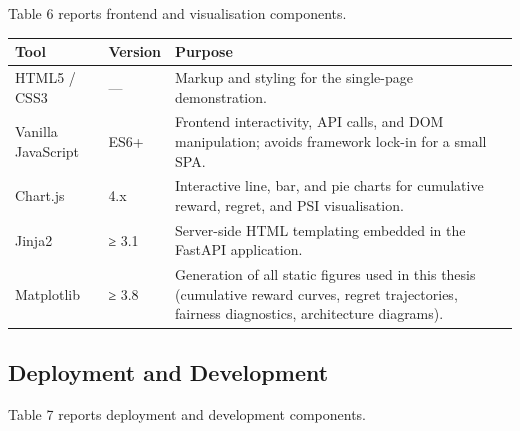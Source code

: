 Table 6 reports frontend and visualisation components.

\label{tab:4.3b}

{\def\LTcaptype{none} %
\begin{longtable}[]{@{}
  >{\raggedright\arraybackslash}p{}
  >{\raggedright\arraybackslash}p{}
  >{\raggedright\arraybackslash}p{}@{}}
\toprule\noalign{}
\begin{minipage}[b]{\linewidth}\raggedright
Tool
\end{minipage} & \begin{minipage}[b]{\linewidth}\raggedright
Version
\end{minipage} & \begin{minipage}[b]{\linewidth}\raggedright
Purpose
\end{minipage} \\
\midrule\noalign{}
\endhead
\bottomrule\noalign{}
\endlastfoot
HTML5 / CSS3 & --- & Markup and styling for the single-page demonstration. \\
Vanilla JavaScript & ES6+ & Frontend interactivity, API calls, and DOM manipulation; avoids framework lock-in for a small SPA. \\
Chart.js & 4.x & Interactive line, bar, and pie charts for cumulative reward, regret, and PSI visualisation. \\
Jinja2 & ≥ 3.1 & Server-side HTML templating embedded in the FastAPI application. \\
Matplotlib & ≥ 3.8 & Generation of all static figures used in this thesis (cumulative reward curves, regret trajectories, fairness diagnostics, architecture diagrams). \\
\end{longtable}
}

\subsection{Deployment and Development}\label{deployment-and-development}

Table 7 reports deployment and development components.

\label{tab:4.3c}

